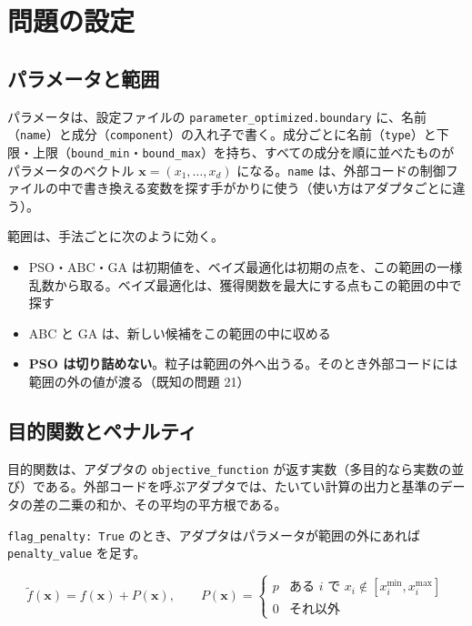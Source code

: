 \documentclass[11pt,a4paper,dvipdfmx]{jsarticle}
\begin{document}
\section{問題の設定}\label{sec:problem}

\subsection{パラメータと範囲}

パラメータは、設定ファイルの \texttt{parameter\_optimized.boundary} に、名前（\texttt{name}）と成分（\texttt{component}）の入れ子で書く。成分ごとに名前（\texttt{type}）と下限・上限（\texttt{bound\_min}・\texttt{bound\_max}）を持ち、すべての成分を順に並べたものがパラメータのベクトル $\mathbf{x} = (x_1, \dots, x_d)$ になる。\texttt{name} は、外部コードの制御ファイルの中で書き換える変数を探す手がかりに使う（使い方はアダプタごとに違う）。

範囲は、手法ごとに次のように効く。

\begin{itemize}
\item PSO・ABC・GA は初期値を、ベイズ最適化は初期の点を、この範囲の一様乱数から取る。ベイズ最適化は、獲得関数を最大にする点もこの範囲の中で探す
\item ABC と GA は、新しい候補をこの範囲の中に収める
\item \textbf{PSO は切り詰めない}。粒子は範囲の外へ出うる。そのとき外部コードには範囲の外の値が渡る（既知の問題 21）
\end{itemize}

\subsection{目的関数とペナルティ}

目的関数は、アダプタの \texttt{objective\_function} が返す実数（多目的なら実数の並び）である。外部コードを呼ぶアダプタでは、たいてい計算の出力と基準のデータの差の二乗の和か、その平均の平方根である。

\texttt{flag\_penalty: True} のとき、アダプタはパラメータが範囲の外にあれば \texttt{penalty\_value} を足す。

\begin{equation}
  \tilde f(\mathbf{x}) = f(\mathbf{x}) + P(\mathbf{x}),\qquad
  P(\mathbf{x}) =
  \begin{cases}
    p & \text{ある } i \text{ で } x_i \notin [x_i^{\min}, x_i^{\max}]\\
    0 & \text{それ以外}
  \end{cases}
\end{equation}
\end{document}
